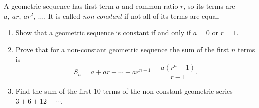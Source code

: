 A geometric sequence has first term $a$ and common ratio $r$, so its terms are $a,\ ar,\ ar^2,\ \dots$. It is called \emph{non-constant} if not all of its terms are equal.
\begin{enumerate}
\item[(a)] Show that a geometric sequence is constant if and only if $a=0$ or $r=1$.
\item[(b)] Prove that for a non-constant geometric sequence the sum of the first $n$ terms is
\[S_n=a+ar+\cdots+ar^{n-1}=\dfrac{a\left(r^n-1\right)}{r-1}.\]
\item[(c)] Find the sum of the first $10$ terms of the non-constant geometric series $3+6+12+\cdots$.
\end{enumerate}
